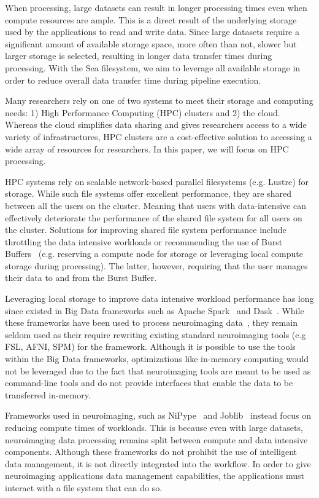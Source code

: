 \documentclass[10pt,journal,compsoc]{IEEEtran}
\begin{document}
When processing, large datasets can result in longer processing times even when compute resources are ample.
This is a direct result of the underlying storage used by the applications to read and write data. Since large
datasets require a significant amount of available storage space, more often than not, slower but larger storage is
selected, resulting in longer data transfer times during processing. With the Sea filesystem, we aim to
leverage all available storage in order to reduce overall data transfer time during pipeline execution.

Many researchers rely on one of two systems to meet their storage and computing needs: 1) High Performance 
Computing (HPC) clusters and 2) the cloud. Whereas the cloud simplifies data sharing and gives researchers
access to a wide variety of infrastructures, HPC clusters are a cost-effective solution to accessing a wide
array of resources for researchers. In this paper, we will focus on HPC processing.

HPC systems rely on scalable network-based parallel filesystems (e.g. Lustre) for storage. While such file
systems offer excellent performance, they are shared between all the users on the cluster. Meaning that users
with data-intensive can effectively deteriorate the performance of the shared file system for all users on
the cluster. Solutions for improving shared file system performance include throttling the data intensive workloads
or recommending the use of Burst Buffers~\cite{bb} (e.g. reserving a compute node for storage or leveraging
local compute storage during processing). The latter, however, requiring that the user manages their data to
and from the Burst Buffer.

Leveraging local storage to improve data intensive workload performance has long since existed in Big Data
frameworks such as Apache Spark~\cite{spark} and Dask~\cite{dask}. While these frameworks have been used to
process neuroimaging data~\cite{manypapers}, they remain seldom used as their require rewriting existing
standard neuroimaging tools (e.g FSL, AFNI, SPM) for the framework. Although it is possible to use the
tools within the Big Data frameworks, optimizations like in-memory computing would not be leveraged due to 
the fact that neuroimaging tools are meant to be used as command-line tools and do not provide interfaces that 
enable the data to be transferred in-memory.

Frameworks used in neuroimaging, such as NiPype~\cite{nipype} and Joblib~\cite{joblib} instead focus on reducing compute times of workloads.
This is because even with large datasets, neuroimaging data processing remains split between compute and data
intensive components. Although these frameworks do not prohibit the use of intelligent data management, it is not directly integrated
into the workflow. In order to give neuroimaging applications data management capabilities, the applications must interact with a
file system that can do so.
\end{document}
